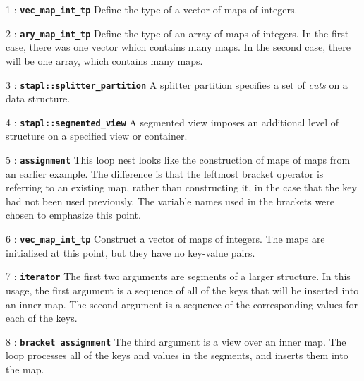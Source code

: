 \documentclass{report}
\begin{document}
\begin{hashitemize}
\item 1 : \texttt{{\bf vec\_map\_int\_tp}}
\newline
Define the type of a vector of maps of integers.

\item 2 : \texttt{{\bf ary\_map\_int\_tp}}
\newline
Define the type of an array of maps of integers.  In the first case, there
was one vector which contains many maps.  In the second case, there will be
one array, which contains many maps.

\item 3 : \texttt{{\bf stapl::splitter\_partition}}
\newline
A splitter partition specifies a set of \emph{cuts} on a data structure.

\item 4 : \texttt{{\bf stapl::segmented\_view}}
\newline
A segmented view imposes an additional level of structure on a specified
view or container.

\item 5 : \texttt{{\bf assignment}}
\newline
This loop nest looks like the construction of maps of maps from an earlier
example.  The difference is that the leftmost bracket operator is referring to
an existing map, rather than constructing it, in the case that the key
had not been used previously.  The variable names used in the brackets
were chosen to emphasize this point.

\item 6 : \texttt{{\bf vec\_map\_int\_tp}}
\newline
Construct a vector of maps of integers.  The maps are initialized at
this point, but they have no key-value pairs.

\item 7 : \texttt{{\bf iterator}}
\newline
The first two arguments are segments of a larger structure.  In this usage,
the first argument is a sequence of all of the keys that will be inserted
into an inner map.  The second argument is a sequence of the corresponding
values for each of the keys.

\item 8 : \texttt{{\bf bracket assignment}}
\newline
The third argument is a view over an inner map.  The loop processes
all of the keys and values in the segments, and inserts them into the map.


\end{hashitemize}
\end{document}
